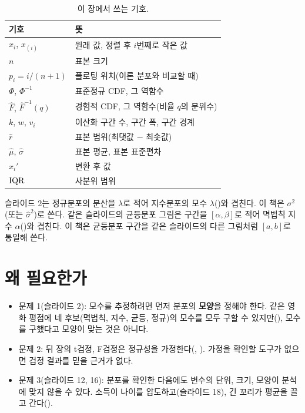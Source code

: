 \begin{table}[H]\centering
\begin{tabularx}{\linewidth}{@{}l X@{}}
\toprule
기호 & 뜻 \\
\midrule
$x_i$, $x_{(i)}$ & 원래 값, 정렬 후 $i$번째로 작은 값 \\
\midrule
$n$ & 표본 크기 \\
\midrule
$p_i = i/(n+1)$ & 플로팅 위치(이론 분포와 비교할 때) \\
\midrule
$\Phi$, $\Phi^{-1}$ & 표준정규 CDF, 그 역함수 \\
\midrule
$\hat F$, $\hat F^{-1}(q)$ & 경험적 CDF, 그 역함수(비율 $q$의 분위수) \\
\midrule
$k$, $w$, $v_i$ & 이산화 구간 수, 구간 폭, 구간 경계 \\
\midrule
$\hat r$ & 표본 범위(최댓값 $-$ 최솟값) \\
\midrule
$\hat\mu$, $\hat\sigma$ & 표본 평균, 표본 표준편차 \\
\midrule
$x_i'$ & 변환 후 값 \\
\midrule
$\mathrm{IQR}$ & 사분위 범위 \\
\bottomrule
\end{tabularx}
\caption{이 장에서 쓰는 기호.}
\label{tab:qq-symbols}
\end{table}

\begin{pitfall}[기호 충돌 둘]
슬라이드 2는 정규분포의 분산을 $\lambda$로 적어 지수분포의
모수 $\lambda$()와 겹친다. 이 책은 $\sigma^2$(또는
$\hat\sigma^2$)로 쓴다. 같은 슬라이드의 균등분포 그림은 구간을
$[\alpha, \beta]$로 적어 멱법칙 지수 $\alpha$()와
겹친다. 이 책은 균등분포 구간을 같은 슬라이드의 다른 그림처럼 $[a, b]$로 통일해
쓴다.
\end{pitfall}

\section{왜 필요한가}
\label{sec:qq-why}

\begin{itemize}
  \item 문제 1(슬라이드 2): 모수를 추정하려면 먼저 분포의 \textbf{모양}을
        정해야 한다. 같은 영화 평점에 네 후보(멱법칙, 지수, 균등, 정규)의
        모수를 모두 구할 수 있지만(), 모수를 구했다고
        모양이 맞는 것은 아니다.
  \item 문제 2: 뒤 장의 t검정, F검정은 정규성을 가정한다(,
        ). 가정을 확인할 도구가 없으면 검정 결과를 믿을
        근거가 없다.
  \item 문제 3(슬라이드 12, 16): 분포를 확인한 다음에도 변수의 단위, 크기,
        모양이 분석에 맞지 않을 수 있다. 소득이 나이를 압도하고(슬라이드
        18), 긴 꼬리가 평균을 끌고 간다().
\end{itemize}

